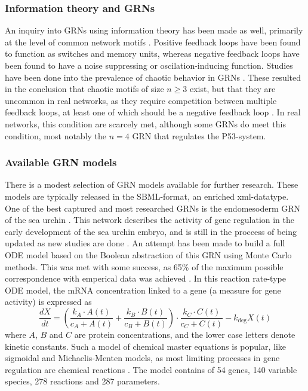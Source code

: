 \documentclass[../main.tex]{subfiles}
\begin{document}
\subsubsection{Information theory and GRNs}

An inquiry into GRNs using information theory has been made as well, primarily at the level of common network motifs \cite{zhang2012chaotic}.
Positive feedback loops have been found to function as switches and memory units, whereas negative feedback loops have been found to have a noise suppressing or oscilation-inducing function.
Studies have been done into the prevalence of chaotic behavior in GRNs \cite{zhang2012chaotic}.
These resulted in the conclusion that chaotic motifs of size $n\ge 3$ exist, but that they are uncommon in real networks, as they require competition between multiple feedback loops, at least one of which should be a negative feedback loop \cite{zhang2012chaotic}.
In real networks, this condition are scarcely met, although some GRNs do meet this condition, most notably the $n=4$ GRN that regulates the P53-system.

\subsubsection{Available GRN models}

There is a modest selection of GRN models available for further research.
These models are typically released in the SBML-format, an enriched xml-datatype.
One of the best captured and most researched GRNs is the endomesoderm GRN of the sea urchin \cite{bolouri2002modeling, kuhn2009monte}.
This network describes the activity of gene regulation in the early development of the sea urchin embryo, and is still in the proccess of being updated as new studies are done \cite{urchinmodel}.
An attempt has been made to build a full ODE model based on the Boolean abstraction of this GRN using Monte Carlo methods.
This was met with some success, as 65\% of the maximum possible correspondence with emperical data was achieved \cite{kuhn2009monte}.
In this reaction rate-type ODE model, the mRNA concentration linked to a gene (a measure for gene activity) is expressed as
%
\begin{equation}
\frac{dX}{dt} = (\frac{k_A \cdot A\left( t \right)}{c_A + A\left( t \right)} + \frac{k_B \cdot B\left( t \right)}{c_B + B\left( t \right)}) \cdot \frac{k_C \cdot C\left( t \right)}{c_C + C\left( t \right)} - k_\mathrm{deg} X\left( t \right)
\end{equation}
%
where $A$, $B$ and $C$ are protein concentrations, and the lower case letters denote kinetic constants.
Such a model of chemical master equations is popular, like sigmoidal and Michaelis-Menten models, as most limiting processes in gene regulation are chemical reactions \cite{aijo2009learning}.
The model contains of 54 genes, 140 variable species, 278 reactions and 287 parameters.
\end{document}

